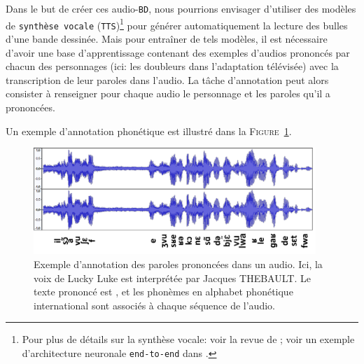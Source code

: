 			Dans le but de créer ces audio-\texttt{BD}, nous pourrions envisager d'utiliser des modèles de \texttt{synthèse vocale} (\texttt{TTS})\footnote{Pour plus de détails sur la synthèse vocale: voir la revue de \cite{kothadiya-etal:2020:different-methods-review} ; voir un exemple d'architecture neuronale \texttt{end-to-end} dans \cite{mu-etal:2021:review-endtoend-speech}.} pour générer automatiquement la lecture des bulles d'une bande dessinée.
			Mais pour entraîner de tels modèles, il est nécessaire d'avoir une base d'apprentissage contenant des exemples d'audios prononcés par chacun des personnages (ici: les doubleurs dans l'adaptation télévisée) avec la transcription de leur paroles dans l'audio.
			La tâche d'annotation peut alors consister à renseigner pour chaque audio le personnage et les paroles qu'il a prononcées.
			
			Un exemple d'annotation phonétique est illustré dans la \textsc{Figure~\ref{figure:2.1.2.D-PRESENTATION-ANNOTATION-EXEMPLES-TRANSCRIPTION}}.
			\begin{leftBarExamples}
				\begin{figure}[H]
					\centering
					\includegraphics[width=0.95\textwidth]{figures/etatdelart-thebault-transcription}
					\caption{
						Exemple d'annotation des paroles prononcées dans un audio.
						Ici, la voix de Lucky Luke est interprétée par Jacques THEBAULT. Le texte prononcé est  , et les phonèmes en alphabet phonétique international sont associés à chaque séquence de l'audio.
					}
					\label{figure:2.1.2.D-PRESENTATION-ANNOTATION-EXEMPLES-TRANSCRIPTION}
				\end{figure}
			\end{leftBarExamples}
			
